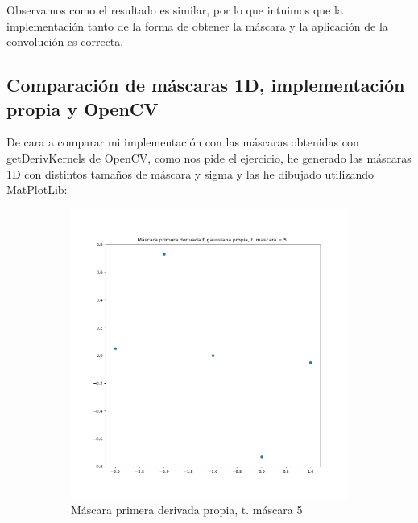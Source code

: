 \documentclass[12pt, spanish]{article}
\begin{document}
Observamos como el resultado es similar, por lo que intuimos que la implementación tanto de la forma de obtener la máscara y la aplicación de la convolución es correcta.

\subsection{Comparación de máscaras 1D, implementación propia y OpenCV}

De cara a comparar mi implementación con las máscaras obtenidas con getDerivKernels\cite{getDerivKernelsCV} de OpenCV, como nos pide el ejercicio, he generado las máscaras 1D con distintos tamaños de máscara y sigma y las he dibujado utilizando MatPlotLib:


\begin{figure}[H]
  \centering
	\begin{subfigure}[t]{0.4\textwidth}
		\centering
		\includegraphics[width = \textwidth]{cmp-p5.png}
 		 \caption{Máscara primera derivada propia, t. máscara 5}
	\end{subfigure}
	\hspace{1cm}
	\begin{subfigure}[t]{0.4\textwidth}
		\centering

\end{subfigure}
\end{figure}
\end{document}
